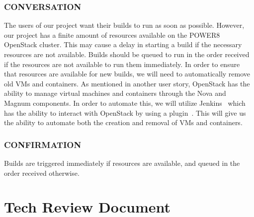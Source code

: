 \documentclass[10pt,letterpaper,onecolumn,draftclsnofoot]{IEEEtran}
\begin{document}
\subsubsection{CONVERSATION}
The users of our project want their builds to run as soon as possible.
However, our project has a finite amount of resources available on the POWER8 OpenStack cluster.
This may cause a delay in starting a build if the necessary resources are not available.
Builds should be queued to run in the order received if the resources are not available to run them immediately.
In order to ensure that resources are available for new builds, we will need to automatically remove old VMs and containers.
As mentioned in another user story, OpenStack has the ability to manage virtual machines and containers through the Nova and Magnum components.
In order to automate this, we will utilize Jenkins~\cite{jenkinsmain} which has the ability to interact with OpenStack by using a plugin~\cite{jcloudsplugin}.
This will give us the ability to automate both the creation and removal of VMs and containers.
\subsubsection{CONFIRMATION}
Builds are triggered immediately if resources are available, and queued in the order received otherwise.
\clearpage
\section{Tech Review Document}
\end{document}
